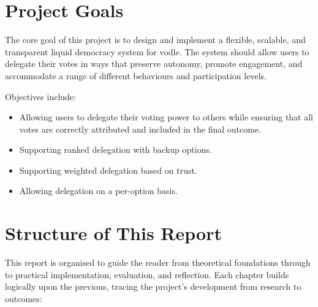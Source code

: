 \section{Project Goals}

The core goal of this project is to design and implement a flexible, scalable, and transparent liquid democracy system for vodle. The system should allow users to delegate their votes in ways that preserve autonomy, promote engagement, and accommodate a range of different behaviours and participation levels.

Objectives include:
\begin{itemize}
    \item Allowing users to delegate their voting power to others while ensuring that all votes are correctly attributed and included in the final outcome.
    \item Supporting ranked delegation with backup options.
    \item Supporting weighted delegation based on trust.
    \item Allowing delegation on a per-option basis.
\end{itemize}

\section{Structure of This Report}

This report is organised to guide the reader from theoretical foundations through to practical implementation, evaluation, and reflection. Each chapter builds logically upon the previous, tracing the project's development from research to outcomes:

